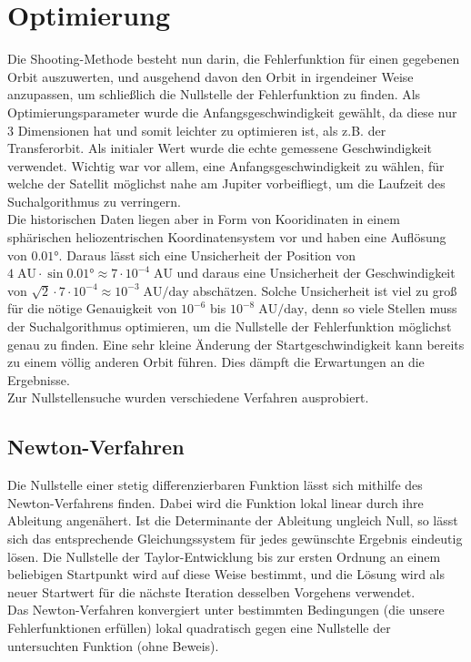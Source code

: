 \section{Optimierung}
Die Shooting-Methode besteht nun darin, die Fehlerfunktion für einen gegebenen Orbit auszuwerten, und ausgehend davon den Orbit in irgendeiner Weise anzupassen, um schließlich die Nullstelle der Fehlerfunktion zu finden.
Als Optimierungsparameter wurde die Anfangsgeschwindigkeit gewählt, da diese nur 3 Dimensionen hat und somit leichter zu optimieren ist, als z.B. der Transferorbit.
Als initialer Wert wurde die echte gemessene Geschwindigkeit verwendet. Wichtig war vor allem, eine Anfangsgeschwindigkeit zu wählen, für welche der Satellit möglichst nahe am Jupiter vorbeifliegt, um die Laufzeit des Suchalgorithmus zu verringern. \\
Die historischen Daten liegen aber in Form von Kooridinaten in einem sphärischen heliozentrischen Koordinatensystem vor und haben eine Auflösung von $0.01\text{°}$.
Daraus lässt sich eine Unsicherheit der Position von $4\;\text{AU}\cdot\sin 0.01\text{°}\approx 7\cdot 10^{-4}\;\text{AU}$ und daraus eine Unsicherheit der Geschwindigkeit von $\sqrt{2}\cdot 7\cdot 10^{-4} \approx 10^{-3}\;\text{AU/day}$ abschätzen.
Solche Unsicherheit ist viel zu groß für die nötige Genauigkeit von $10^{-6}$ bis $10^{-8}\;\text{AU/day}$, denn so viele Stellen muss der Suchalgorithmus optimieren, um die Nullstelle der Fehlerfunktion möglichst genau zu finden. Eine sehr kleine Änderung der Startgeschwindigkeit kann bereits zu einem völlig anderen Orbit führen. Dies dämpft die Erwartungen an die Ergebnisse.\\
Zur Nullstellensuche wurden verschiedene Verfahren ausprobiert.

\subsection{Newton-Verfahren}

Die Nullstelle einer stetig differenzierbaren Funktion lässt sich mithilfe des Newton-Verfahrens finden. Dabei wird die Funktion lokal linear durch ihre Ableitung angenähert. Ist die Determinante der Ableitung ungleich Null, so lässt sich das entsprechende Gleichungssystem für jedes gewünschte Ergebnis eindeutig lösen. Die Nullstelle der Taylor-Entwicklung bis zur ersten Ordnung an einem beliebigen Startpunkt wird auf diese Weise bestimmt, und die Lösung wird als neuer Startwert für die nächste Iteration desselben Vorgehens verwendet. \\
Das Newton-Verfahren konvergiert unter bestimmten Bedingungen (die unsere Fehlerfunktionen erfüllen) lokal quadratisch gegen eine Nullstelle der untersuchten Funktion (ohne Beweis).

